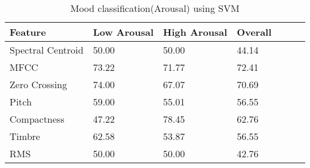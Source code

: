 \begin{table}[h!]
        \caption{Mood classification(Arousal) using SVM}
        \begin{center}
                \begin{tabular}{|l|l|l|l|l|l|l|}
                        \hline
                        Feature
                        &
                        Low Arousal
                        &
                        High Arousal
                        &
                        Overall
                        \\\hline

                        Spectral Centroid
                        &
                        50.00
                        &
                        50.00
                        &
                        44.14
                        \\\hline

                        MFCC
                        &
                        73.22
                        &
                        71.77
                        &
                        72.41
                        \\\hline

                        Zero Crossing
                        &
                        74.00
                        &
                        67.07
                        &
                        70.69
                        \\\hline

                        Pitch
                        &
                        59.00
                        &
                        55.01
                        &
                        56.55
                        \\\hline

                        Compactness
                        &
                        47.22
                        &
                        78.45
                        &
                        62.76
                        \\\hline

                        Timbre
                        &
                        62.58
                        &
                        53.87
                        &
                        56.55
                        \\\hline

                        RMS
                        &
                        50.00
                        &
                        50.00
                        &
                        42.76
                        \\\hline


\end{tabular}
\end{center}
\end{table}
